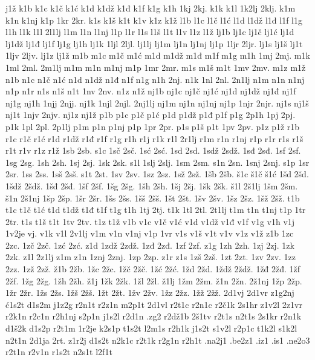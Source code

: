 {j1ž
k1b
k1c
k1č
k1ć
k1d
k1dž
k1đ
k1f
k1g
k1h
1kj
2kj.
k1k
k1l
1k2lj
2klj.
k1m
k1n
k1nj
k1p
1kr
2kr.
k1s
k1š
k1t
k1v
k1z
k1ž
l1b
l1c
l1č
l1ć
l1d
l1dž
l1đ
l1f
l1g
l1h
l1k
l1l
2l1lj
l1m
l1n
l1nj
l1p
l1r
l1s
l1š
l1t
l1v
l1z
l1ž
lj1b
lj1c
lj1č
lj1ć
lj1d
lj1dž
lj1đ
lj1f
lj1g
lj1h
lj1k
1ljl
2ljl.
lj1lj
lj1m
lj1n
lj1nj
lj1p
1ljr
2ljr.
lj1s
lj1š
lj1t
1ljv
2ljv.
lj1z
lj1ž
m1b
m1c
m1č
m1ć
m1d
m1dž
m1đ
m1f
m1g
m1h
1mj
2mj.
m1k
1ml
2ml.
2m1lj
m1m
m1n
m1nj
m1p
1mr
2mr.
m1s
m1š
m1t
1mv
2mv.
m1z
m1ž
n1b
n1c
n1č
n1ć
n1d
n1dž
n1đ
n1f
n1g
n1h
2nj.
n1k
1nl
2nl.
2n1lj
n1m
n1n
n1nj
n1p
n1r
n1s
n1š
n1t
1nv
2nv.
n1z
n1ž
nj1b
nj1c
nj1č
nj1ć
nj1d
nj1dž
nj1đ
nj1f
nj1g
nj1h
1njj
2njj.
nj1k
1njl
2njl.
2nj1lj
nj1m
nj1n
nj1nj
nj1p
1njr
2njr.
nj1s
nj1š
nj1t
1njv
2njv.
nj1z
nj1ž
p1b
p1c
p1č
p1ć
p1d
p1dž
p1đ
p1f
p1g
2p1h
1pj
2pj.
p1k
1pl
2pl.
2p1lj
p1m
p1n
p1nj
p1p
1pr
2pr.
p1s
p1š
p1t
1pv
2pv.
p1z
p1ž
r1b
r1c
r1č
r1ć
r1d
r1dž
r1đ
r1f
r1g
r1h
r1j
r1k
r1l
2r1lj
r1m
r1n
r1nj
r1p
r1r
r1s
r1š
r1t
r1v
r1z
r1ž
1sb
2sb.
s1c
1sč
2sč.
1sć
2sć.
1sd
2sd.
1sdž
2sdž.
1sđ
2sđ.
1sf
2sf.
1sg
2sg.
1sh
2sh.
1sj
2sj.
1sk
2sk.
s1l
1slj
2slj.
1sm
2sm.
s1n
2sn.
1snj
2snj.
s1p
1sr
2sr.
1ss
2ss.
1sš
2sš.
s1t
2st.
1sv
2sv.
1sz
2sz.
1sž
2sž.
1šb
2šb.
š1c
š1č
š1ć
1šd
2šd.
1šdž
2šdž.
1šđ
2šđ.
1šf
2šf.
1šg
2šg.
1šh
2šh.
1šj
2šj.
1šk
2šk.
š1l
2š1lj
1šm
2šm.
š1n
2š1nj
1šp
2šp.
1šr
2šr.
1šs
2šs.
1šš
2šš.
1št
2št.
1šv
2šv.
1šz
2šz.
1šž
2šž.
t1b
t1c
t1č
t1ć
t1d
t1dž
t1đ
t1f
t1g
t1h
1tj
2tj.
t1k
1tl
2tl.
2t1lj
t1m
t1n
t1nj
t1p
1tr
2tr.
t1s
t1š
t1t
1tv
2tv.
t1z
t1ž
v1b
v1c
v1č
v1ć
v1d
v1dž
v1đ
v1f
v1g
v1h
v1j
1v2je
vj.
v1k
v1l
2v1lj
v1m
v1n
v1nj
v1p
1vr
v1s
v1š
v1t
v1v
v1z
v1ž
z1b
1zc
2zc.
1zč
2zč.
1zć
2zć.
z1d
1zdž
2zdž.
1zđ
2zđ.
1zf
2zf.
z1g
1zh
2zh.
1zj
2zj.
1zk
2zk.
z1l
2z1lj
z1m
z1n
1znj
2znj.
1zp
2zp.
z1r
z1s
1zš
2zš.
1zt
2zt.
1zv
2zv.
1zz
2zz.
1zž
2zž.
ž1b
2žb.
1žc
2žc.
1žč
2žč.
1žć
2žć.
1žd
2žd.
1ždž
2ždž.
1žđ
2žđ.
1žf
2žf.
1žg
2žg.
1žh
2žh.
ž1j
1žk
2žk.
1žl
2žl.
ž1lj
1žm
2žm.
ž1n
2žn.
2ž1nj
1žp
2žp.
1žr
2žr.
1žs
2žs.
1žš
2žš.
1žt
2žt.
1žv
2žv.
1žz
2žz.
1žž
2žž.
2d1vj
2d1vr
z1g2nj
ć1s2t
d1s2m
j1z2g
r2n1t
r2z1n
m2p1t
2d1vl
r2t1c
r2n1c
r2č1k
2s1hr
z1v2l
2z1vr
r2k1n
r2c1n
r2h1nj
s2p1n
j1s2l
r2d1n
.zg2
r2dž1b
2š1tv
r2t1s
n2t1s
2s1kr
r2n1k
d1š2k
d1s2p
r2t1m
1r2je
k2s1p
t1s2t
l2m1s
r2h1k
j1s2t
s1v2l
r2p1c
t1k2l
s1k2l
n2t1n
2d1ja
2rt.
z1r2j
d1s2t
n2k1c
r2t1k
r2g1n
r2h1t
.na2j1
.be2z1
.iz1
.is1
.ne2o3
r2t1n
r2v1n
r1s2t
n2s1t
l2f1t
}
